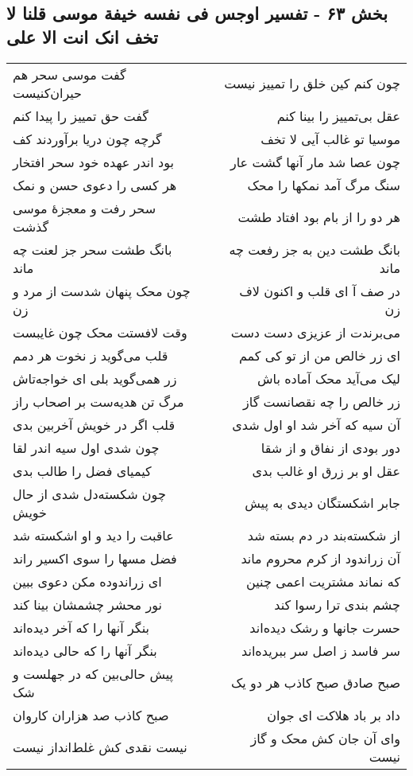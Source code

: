 \begin{center}
\section*{بخش ۶۳ - تفسیر اوجس فی نفسه خیفة موسی قلنا لا تخف انک انت الا علی}
\label{sec:sh063}
\begin{longtable}{l p{0.5cm} r}
گفت موسی سحر هم حیران‌کنیست
&&
چون کنم کین خلق را تمییز نیست
\\
گفت حق تمییز را پیدا کنم
&&
عقل بی‌تمییز را بینا کنم
\\
گرچه چون دریا برآوردند کف
&&
موسیا تو غالب آیی لا تخف
\\
بود اندر عهده خود سحر افتخار
&&
چون عصا شد مار آنها گشت عار
\\
هر کسی را دعوی حسن و نمک
&&
سنگ مرگ آمد نمکها را محک
\\
سحر رفت و معجزهٔ موسی گذشت
&&
هر دو را از بام بود افتاد طشت
\\
بانگ طشت سحر جز لعنت چه ماند
&&
بانگ طشت دین به جز رفعت چه ماند
\\
چون محک پنهان شدست از مرد و زن
&&
در صف آ ای قلب و اکنون لاف زن
\\
وقت لافستت محک چون غایبست
&&
می‌برندت از عزیزی دست دست
\\
قلب می‌گوید ز نخوت هر دمم
&&
ای زر خالص من از تو کی کمم
\\
زر همی‌گوید بلی ای خواجه‌تاش
&&
لیک می‌آید محک آماده باش
\\
مرگ تن هدیه‌ست بر اصحاب راز
&&
زر خالص را چه نقصانست گاز
\\
قلب اگر در خویش آخربین بدی
&&
آن سیه که آخر شد او اول شدی
\\
چون شدی اول سیه اندر لقا
&&
دور بودی از نفاق و از شقا
\\
کیمیای فضل را طالب بدی
&&
عقل او بر زرق او غالب بدی
\\
چون شکسته‌دل شدی از حال خویش
&&
جابر اشکستگان دیدی به پیش
\\
عاقبت را دید و او اشکسته شد
&&
از شکسته‌بند در دم بسته شد
\\
فضل مسها را سوی اکسیر راند
&&
آن زراندود از کرم محروم ماند
\\
ای زراندوده مکن دعوی ببین
&&
که نماند مشتریت اعمی چنین
\\
نور محشر چشمشان بینا کند
&&
چشم بندی ترا رسوا کند
\\
بنگر آنها را که آخر دیده‌اند
&&
حسرت جانها و رشک دیده‌اند
\\
بنگر آنها را که حالی دیده‌اند
&&
سر فاسد ز اصل سر ببریده‌اند
\\
پیش حالی‌بین که در جهلست و شک
&&
صبح صادق صبح کاذب هر دو یک
\\
صبح کاذب صد هزاران کاروان
&&
داد بر باد هلاکت ای جوان
\\
نیست نقدی کش غلط‌انداز نیست
&&
وای آن جان کش محک و گاز نیست
\\
\end{longtable}
\end{center}
